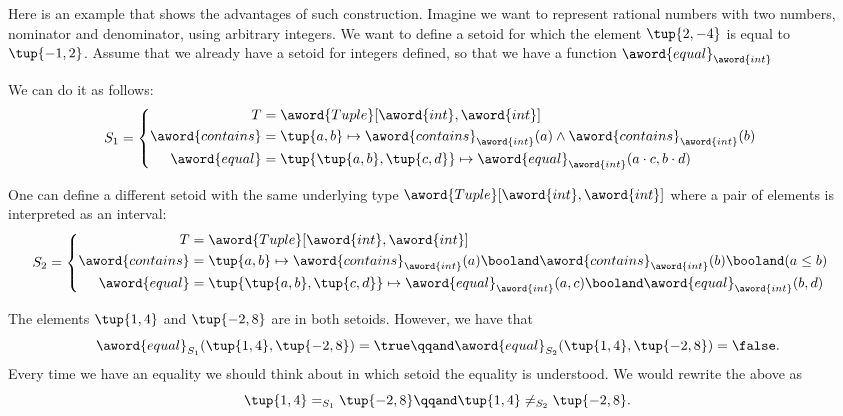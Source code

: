 Here is an example that shows the advantages of such construction.
Imagine we want to represent rational numbers with two numbers, nominator and denominator, using arbitrary integers.
We want to define a setoid for which the element $\tup{2, -4}$ is equal to $\tup{-1, 2}$.
Assume that we already have a setoid for integers defined, so that we have a function $\aword{equal}_{\aword{int}}$

We can do it as follows:
\begin{equation}
    S_1 =
    \begin{cases}
        \begin{aligned}
            T                & =
            \aword{Tuple}[\aword{int}, \aword{int}]
            \\
            \aword{contains} & = \tup{a,b} \mapsto \aword{contains}_{\aword{int}}(a)  \wedge \aword{contains}_{\aword{int}}(b)
            \\
            \aword{equal}    & = \tup{\tup{a,b}, \tup{c,d}}
            \mapsto \aword{equal}_{\aword{int}} (a\cdot c, b\cdot d)
        \end{aligned}
    \end{cases}
\end{equation}

One can define a different setoid with the same underlying type $\aword{Tuple}[\aword{int}, \aword{int}]$ where a pair of elements is interpreted as an interval:
\begin{equation}
    S_2 =
    \begin{cases}
        \begin{aligned}
            T                & = \aword{Tuple}[\aword{int}, \aword{int}] \\
            \aword{contains} & = \tup{a,b} \mapsto
            \aword{contains}_{\aword{int}}(a)
            \booland
            \aword{contains}_{\aword{int}}(b)
            \booland
            (a\leq b) \\
            \aword{equal}    & = \tup{\tup{a,b}, \tup{c,d}}
            \mapsto
            \aword{equal}_{\aword{int}}(a,c)
            \booland
            \aword{equal}_{\aword{int}}(b,d)
        \end{aligned}
    \end{cases}
\end{equation}

The elements $\tup{1,4}$ and $\tup{-2, 8}$ are in both setoids.
However, we have that
\begin{equation}
    \aword{equal}_{S_1} (\tup{1,4}, \tup{-2, 8}) = \true
    \qqand
    \aword{equal}_{S_2} (\tup{1,4}, \tup{-2, 8}) = \false .
\end{equation}
Every time we have an equality we should think about in which setoid the equality is understood.
We would rewrite the above as
\begin{equation}
    \tup{1,4} =_{S_1} \tup{-2, 8}
    \qqand
    \tup{1,4} \neq_{S_2} \tup{-2, 8}.
\end{equation}

